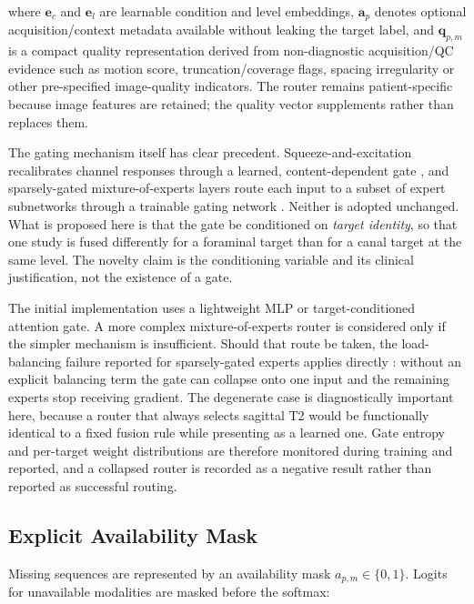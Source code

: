 where $\mathbf{e}_{c}$ and $\mathbf{e}_{l}$ are learnable condition and level
embeddings, $\mathbf{a}_{p}$ denotes optional acquisition/context metadata
available without leaking the target label, and $\mathbf{q}_{p,m}$ is a compact
quality representation derived from non-diagnostic acquisition/QC evidence such
as motion score, truncation/coverage flags, spacing irregularity or other
pre-specified image-quality indicators. The router remains patient-specific
because image features are retained; the quality vector supplements rather than
replaces them.

The gating mechanism itself has clear precedent. Squeeze-and-excitation
recalibrates channel responses through a learned, content-dependent gate
\cite{hu2020squeeze}, and sparsely-gated mixture-of-experts layers route each
input to a subset of expert subnetworks through a trainable gating network
\cite{shazeer2017outrageously}. Neither is adopted unchanged. What is proposed
here is that the gate be conditioned on \emph{target identity}, so that one
study is fused differently for a foraminal target than for a canal target at
the same level. The novelty claim is the conditioning variable and its clinical
justification, not the existence of a gate.

The initial implementation uses a lightweight MLP or target-conditioned
attention gate. A more complex mixture-of-experts router is considered only if
the simpler mechanism is insufficient. Should that route be taken, the
load-balancing failure reported for sparsely-gated experts applies directly
\cite{shazeer2017outrageously}: without an explicit balancing term the gate can
collapse onto one input and the remaining experts stop receiving gradient. The
degenerate case is diagnostically important here, because a router that always
selects sagittal T2 would be functionally identical to a fixed fusion rule while
presenting as a learned one. Gate entropy and per-target weight distributions
are therefore monitored during training and reported, and a collapsed router is
recorded as a negative result rather than reported as successful routing.

\subsection{Explicit Availability Mask}
\label{sec:method-routing-mask}

Missing sequences are represented by an availability mask
$a_{p,m}\in\{0,1\}$. Logits for unavailable modalities are masked before the
softmax:

